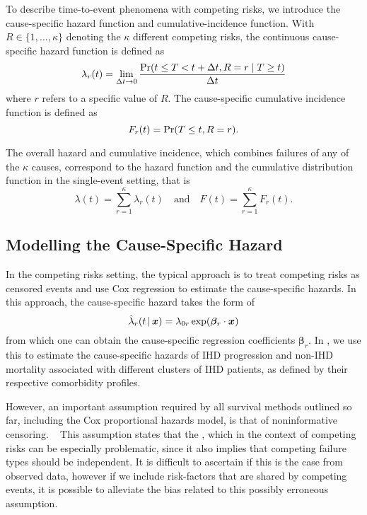 To describe time-to-event phenomena with competing risks, 
we introduce the cause-specific hazard function and 
cumulative-incidence function.
With \(R \in \{1, \dots, \kappa\}\) denoting the \(\kappa\) different competing risks, 
the continuous cause-specific hazard function is defined as
\begin{equation}
    \lambda_r(t) = \lim_{\Delta t \to 0} 
        \frac{\operatorname{\Pr} (t \leq T < t + \Delta t, R=r \mid T \geq t)}{\Delta t}
\end{equation}
where \(r\) refers to a specific value of \(R\).
The cause-specific cumulative incidence function is defined as
~\autocite{kalbfleischStatistical2002}
\begin{equation}
    F_r(t) = \operatorname{\Pr}(T \leq t, R = r).
\end{equation}

The overall hazard and cumulative incidence, 
which combines failures of any of the \(\kappa\) causes,
correspond to the hazard function 
and the cumulative distribution function 
in the single-event setting, that is
\begin{equation}
    \lambda(t) = \sum_{r=1}^{\kappa} \lambda_r(t)
    \quad \text{and} \quad
    F(t) = \sum_{r=1}^{\kappa} F_r(t).
\end{equation}

\subsection{Modelling the Cause-Specific Hazard}

In the competing risks setting, 
the typical approach is to treat competing risks as censored events
and use Cox regression to estimate the cause-specific hazards.
In this approach, the cause-specific hazard takes the form of
\begin{equation}
    \hat{\lambda}_{r}(t \,|\, \bm{x}) 
        = \lambda_{0r} \exp(\bm{\beta}_r \cdot \bm{x})
\end{equation}
from which one can obtain the cause-specific regression coefficients 
\(\bm{\beta}_r\).
In \studyi{}, we use this to estimate the cause-specific hazards
of \ac{IHD} progression and non-\ac{IHD} mortality associated with 
different clusters of \ac{IHD} patients, 
as defined by their respective comorbidity profiles.

However, an important assumption required by all survival methods
outlined so far, including the Cox proportional hazards model,
is that of noninformative censoring.
~\autocite{kleinbaumSurvival2011}
This assumption states that the
, which in the context of competing risks can be especially problematic,
since it also implies that competing failure types should be independent.
It is difficult to ascertain if this is the case from observed data, 
however if we include risk-factors that are shared by competing events,
it is possible to alleviate the bias related to this possibly erroneous
assumption.
~\autocite{kleinbaumSurvival2011}

